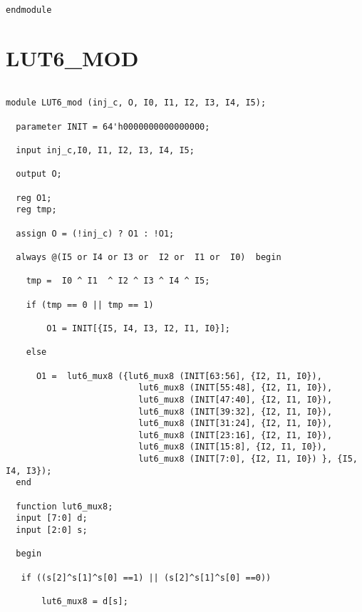 \begin{lstlisting}
endmodule
\end{lstlisting}

\section{LUT6\_MOD}
\begin{lstlisting}

module LUT6_mod (inj_c, O, I0, I1, I2, I3, I4, I5);

  parameter INIT = 64'h0000000000000000;

  input inj_c,I0, I1, I2, I3, I4, I5;

  output O;

  reg O1;
  reg tmp;

  assign O = (!inj_c) ? O1 : !O1;
  
  always @(I5 or I4 or I3 or  I2 or  I1 or  I0)  begin
 
    tmp =  I0 ^ I1  ^ I2 ^ I3 ^ I4 ^ I5;

    if (tmp == 0 || tmp == 1)

        O1 = INIT[{I5, I4, I3, I2, I1, I0}];

    else 
    
      O1 =  lut6_mux8 ({lut6_mux8 (INIT[63:56], {I2, I1, I0}),
                          lut6_mux8 (INIT[55:48], {I2, I1, I0}),
                          lut6_mux8 (INIT[47:40], {I2, I1, I0}),
                          lut6_mux8 (INIT[39:32], {I2, I1, I0}),
                          lut6_mux8 (INIT[31:24], {I2, I1, I0}),
                          lut6_mux8 (INIT[23:16], {I2, I1, I0}),
                          lut6_mux8 (INIT[15:8], {I2, I1, I0}),
                          lut6_mux8 (INIT[7:0], {I2, I1, I0}) }, {I5, I4, I3});
  end

  function lut6_mux8;
  input [7:0] d;
  input [2:0] s;
   
  begin

   if ((s[2]^s[1]^s[0] ==1) || (s[2]^s[1]^s[0] ==0))
           
       lut6_mux8 = d[s];


\end{lstlisting}
